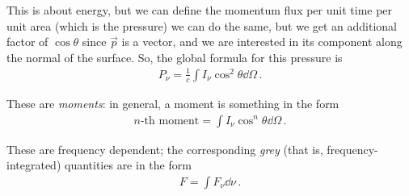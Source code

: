 \documentclass[main.tex]{subfiles}
\begin{document}
This is about energy, but we can define the momentum flux per unit time per unit area (which is the pressure) we can do the same, but we get an additional factor of \(\cos \theta \) since \(\vec{p}\) is a vector, and we are interested in its component along the normal of the surface.
So, the global formula for this pressure is 
%
\begin{align}
P_{\nu } = \frac{1}{c} \int I_{\nu } \cos^2\theta \dd{\Omega } 
\,.
\end{align}

These are \emph{moments}: in general, a moment is something in the form 
%
\begin{align}
\text{\(n\)-th moment} = \int I_{\nu } \cos^{n} \theta \dd{\Omega }
\,.
\end{align}

These are frequency dependent; the corresponding \emph{grey} (that is, frequency-integrated) quantities are in the form 
%
\begin{align}
F = \int F_{\nu } \dd{\nu }
\,.
\end{align}
\end{document}
